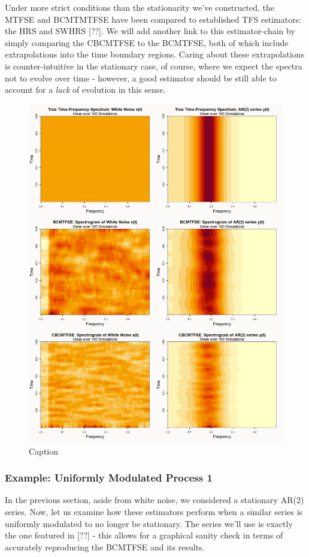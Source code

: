 \documentclass{article}
\begin{document}
Under more strict conditions than the stationarity we've constructed, the MTFSE and BCMTMTFSE have been compared to established TFS estimators: the HRS and SWHRS [??]. We will add another link to this estimator-chain by simply comparing the CBCMTFSE to the BCMTFSE, both of which include extrapolations into the time boundary regions. Caring about these extrapolations is counter-intuitive in the stationary case, of course, where we expect the spectra not to evolve over time - however, a good estimator should be still able to account for a \textit{lack} of evolution in this sense.

\begin{figure}
    \centering
    \includegraphics[width=\linewidth]{Fig/sgrams_0.png}
    \caption{Caption}
    \label{fig:1}
\end{figure}

\subsubsection{Example: Uniformly Modulated Process 1}
In the previous section, aside from white noise, we considered a stationary AR(2) series. Now, let us examine how these estimators perform when a similar series is uniformly modulated to no longer be stationary. The series we'll use is exactly the one featured in [??] - this allows for a graphical sanity check in terms of accurately reproducing the BCMTFSE and its results.
\end{document}
